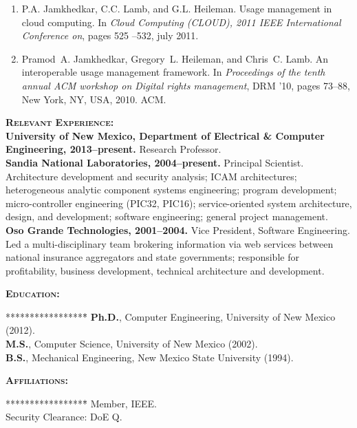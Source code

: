 \documentclass{sbir}
\begin{document}
{{{\begin{enumerate}
\item P.A. Jamkhedkar, C.C. Lamb, and G.L. Heileman.
\newblock Usage management in cloud computing.
\newblock In {\em Cloud Computing (CLOUD), 2011 IEEE International Conference on}, pages 525 --532, july 2011.

\item Pramod~A. Jamkhedkar, Gregory~L. Heileman, and Chris~C. Lamb.
\newblock An interoperable usage management framework.
\newblock In {\em Proceedings of the tenth annual ACM workshop on Digital rights management}, DRM '10, pages 73--88, New York, NY, USA, 2010. ACM.
\end{enumerate}

\vspace{-6pt}
\textbf{\textsc{Relevant Experience:}}~\\
{\bfseries University of New Mexico, Department of Electrical \& Computer Engineering, 2013--present.} Research Professor.~\\
{\bfseries Sandia National Laboratories, 2004--present.} Principal Scientist. Architecture development and security analysis; ICAM architectures; heterogeneous analytic component systems engineering; program development; micro-controller engineering (PIC32, PIC16); service-oriented system architecture, design, and development; software engineering; general project management.~\\
{\bfseries Oso Grande Technologies, 2001--2004.} Vice President, Software Engineering. Led a multi-disciplinary team brokering information via web services between national insurance aggregators and state governments; responsible for profitability, business development, technical architecture and development.

\vspace{-6pt}
\textbf{\textsc{Education:}}
\vspace{-30pt}
\begin{tabbing}*****************\=\kill
\> {\bfseries Ph.D.}, Computer Engineering, University of New Mexico (2012). \\
\> {\bfseries M.S.}, Computer Science, University of New Mexico (2002). \\
\> {\bfseries B.S.}, Mechanical Engineering, New Mexico State University (1994).
\end{tabbing}

\vspace{-12pt}
\textbf{\textsc{Affiliations:}}
\vspace{-30pt}
\begin{tabbing}*****************\=\kill
\> Member, IEEE. \\
\> Security Clearance: DoE Q.
\end{tabbing}

}}}
\end{document}
